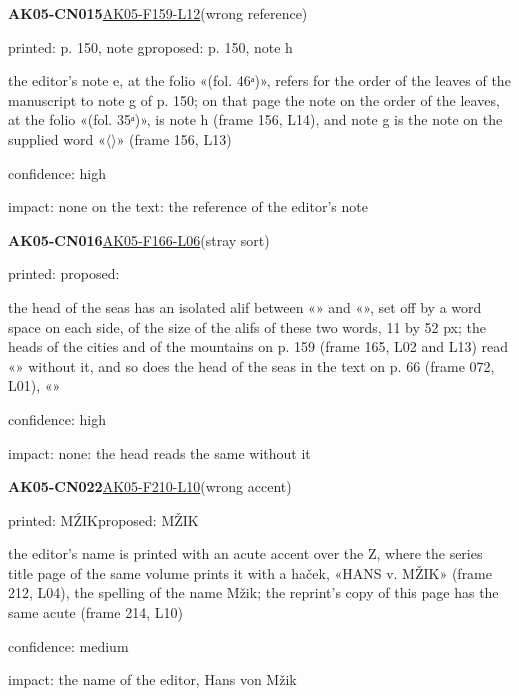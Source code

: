 \documentclass[11pt]{article}
\begin{document}
\noindent\textbf{AK05-CN015}\enspace\hyperlink{AK05-F159-L12}{AK05-F159-L12}\enspace(wrong reference)\par\noindent printed: p. 150, note g\enspace proposed: p. 150, note h\par\noindent the editor's note e, at the folio «(fol. 46ᵃ)», refers for the order of the leaves of the manuscript to note g of p. 150; on that page the note on the order of the leaves, at the folio «(fol. 35ᵃ)», is note h (frame 156, L14), and note g is the note on the supplied word «\ensuremath{\langle}\ensuremath{\rangle}» (frame 156, L13)\par\noindent confidence: high\par\noindent impact: none on the text: the reference of the editor's note\par\medskip
\noindent\textbf{AK05-CN016}\enspace\hyperlink{AK05-F166-L06}{AK05-F166-L06}\enspace(stray sort)\par\noindent printed: \enspace proposed: \par\noindent the head of the seas has an isolated alif between «» and «», set off by a word space on each side, of the size of the alifs of these two words, 11 by 52 px; the heads of the cities and of the mountains on p. 159 (frame 165, L02 and L13) read «» without it, and so does the head of the seas in the text on p. 66 (frame 072, L01), «»\par\noindent confidence: high\par\noindent impact: none: the head reads the same without it\par\medskip
\noindent\textbf{AK05-CN022}\enspace\hyperlink{AK05-F210-L10}{AK05-F210-L10}\enspace(wrong accent)\par\noindent printed: MŹIK\enspace proposed: MŽIK\par\noindent the editor's name is printed with an acute accent over the Z, where the series title page of the same volume prints it with a haček, «HANS v. MŽIK» (frame 212, L04), the spelling of the name Mžik; the reprint's copy of this page has the same acute (frame 214, L10)\par\noindent confidence: medium\par\noindent impact: the name of the editor, Hans von Mžik\par\medskip
\end{document}
